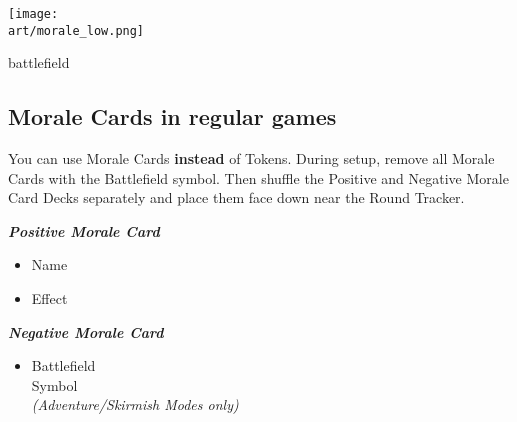 \begin{multicols*}{2}
\vspace*{\fill}
\begin{center}
{\texttt{[image: \\art/morale\_low.png]}}
\end{center}
\vspace*{\fill}

\columnbreak

\begin{expansion}[before=\vspace*{-11mm}]{battlefield}
\subsection*{Morale Cards in regular games}

You can use Morale Cards \textbf{instead} of Tokens.
During setup, remove all Morale Cards with the Battlefield symbol.
Then shuffle the Positive and Negative Morale Card Decks separately and place them face down near the Round Tracker.

\vspace{1em}
\begin{scriptsize}
\end{scriptsize}
\vspace{-1em}
\begin{multicols*}{2}
  \centering
  \footnotesize
  \textbf{\textit{\textcolor{darkcandyapplered}{Positive Morale Card}}}
  \vspace{1em}
  \begin{itemize}
    \item[\textbf{1.}] Name
    \item[\textbf{2.}] Effect
  \end{itemize}
  \columnbreak
  \textbf{\textit{\textcolor{darkcandyapplered}{Negative Morale Card}}}
  \begin{itemize}
    \item[\textbf{3.}] Battlefield\\Symbol\\{\scriptsize\textit{(Adventure/Skirmish Modes only)}}
  \end{itemize}
\end{multicols*}


\end{expansion}
\end{multicols*}
